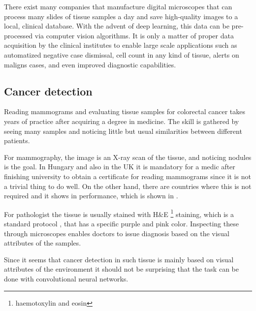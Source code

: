 \documentclass[a4paper,12pt]{article}
\begin{document}
\par There exist many companies that manufacture digital microscopes that can process many slides of tissue samples a day and save high-quality images to a local, clinical database. With the advent of deep learning, this data can be pre-processed via computer vision algorithms. It is only a matter of proper data acquisition by the clinical institutes to enable large scale applications such as automatized negative case dismissal, cell count in any kind of tissue, alerts on maligns cases, and even improved diagnostic capabilities.

\vspace{7mm}

\subsection{Cancer detection}

\vspace{7mm}

\par Reading mammograms and evaluating tissue samples for colorectal cancer takes years of practice after acquiring a degree in medicine. The skill is gathered by seeing many samples and noticing little but usual similarities between different patients. 

\vspace{4mm}

\par For mammography, the image is an X-ray scan of the tissue, and noticing nodules is the goal. In Hungary and also in the UK it is mandatory for a medic after finishing university to obtain a certificate for reading mammograms since it is not a trivial thing to do well. On the other hand, there are countries where this is not required and it shows in performance, which is shown in \cite{mckinney2020international}.

\vspace{4mm}

\par For pathologist the tissue is usually stained with H\&E \footnote{haemotoxylin and eosin} staining, which is a standard protocol \cite{fischer2008hematoxylin}, that has a specific purple and pink color. Inspecting these through microscopes enables doctors to issue diagnosis based on the visual attributes of the samples.

\vspace{4mm}

\par Since it seems that cancer detection in such tissue is mainly based on visual attributes of the environment it should not be surprising that the task can be done with convolutional neural networks.
\end{document}
